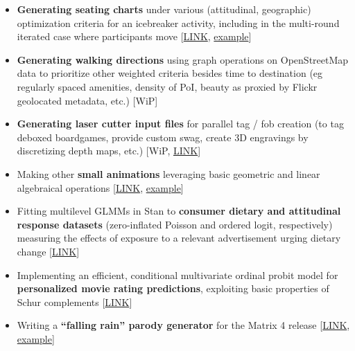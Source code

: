 \documentclass[12pt]{article}
\begin{document}
\begin{itemize}[noitemsep]
\item \textbf{Generating seating charts} under various (attitudinal, geographic) optimization criteria for an icebreaker activity, including in the multi-round iterated case where participants move [\href{https://github.com/NikVetr/minor\_scripts/blob/c8926965b0c6dd9158351cf5836cbc76261f6830/postdoc/optimal_table_seating.R}{LINK}, \href{https://drive.google.com/file/d/1z-D3m9fd-hYQmAHGoDBl3N--k-udfTLb/view?usp=drive\_link}{example}]

\item \textbf{Generating walking directions} using graph operations on OpenStreetMap data to prioritize other weighted criteria besides time to destination (eg regularly spaced amenities, density of PoI, beauty as proxied by Flickr geolocated metadata, etc.) [WiP]

\item \textbf{Generating laser cutter input files} for parallel tag / fob creation (to tag deboxed boardgames, provide custom swag, create 3D engravings by discretizing depth maps, etc.) [WiP, \href{https://github.com/NikVetr/minor\_scripts/blob/master/postdoc/draw\_lasercutter\_input.R}{LINK}]

\item Making other \textbf{small animations} leveraging basic geometric and linear algebraical operations [\href{https://github.com/NikVetr/minor\_scripts/blob/c8926965b0c6dd9158351cf5836cbc76261f6830/postdoc/polygon\_animation.r}{LINK}, \href{https://drive.google.com/file/d/1BCUmNXSr2ST00JxM32t7qBhQXMZEZERv}{example}]

\item Fitting multilevel GLMMs in Stan to \textbf{consumer dietary and attitudinal response datasets} (zero-inflated Poisson and ordered logit, respectively) measuring the effects of exposure to a relevant advertisement urging dietary change [\href{https://github.com/NikVetr/side\_projects/blob/24f7e38876a95433364123441f9b41d260105be6/MFA_Ads.R}{LINK}]

\item Implementing an efficient, conditional multivariate ordinal probit model for \textbf{personalized movie rating predictions}, exploiting basic properties of Schur complements [\href{https://github.com/NikVetr/side\_projects/blob/24f7e38876a95433364123441f9b41d260105be6/movieRatingPersonalization.R}{LINK}]

\item Writing a \textbf{``falling rain'' parody generator} for the Matrix 4 release [\href{https://github.com/NikVetr/montgomery\_lab/blob/61e2ac4b0fea0ee7f5bf31590a40378f0027264a/Matrix\_GreenRain.R#L4}{LINK},  \href{https://drive.google.com/file/d/1hwzzLq9xTpAc2AvFyLTy-L\_ZHG\_VlIK\_}{example}]


\end{itemize}
\end{document}
